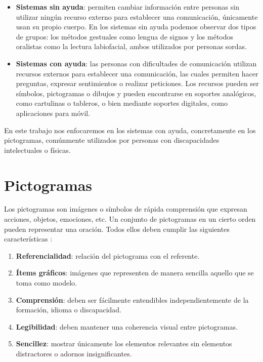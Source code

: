 \begin{itemize}
	\item \textbf{Sistemas sin ayuda}: permiten cambiar información entre personas sin utilizar ningún recurso externo para establecer una comunicación, únicamente usan su propio cuerpo. En los sistemas sin ayuda podemos observar dos tipos de grupos: los métodos gestuales como lengua de signos y los métodos oralistas como la lectura labiofacial, ambos utilizados por personas sordas.
	
	\item \textbf{Sistemas con ayuda}: las personas con dificultades de comunicación utilizan recursos externos para establecer una comunicación, las cuales permiten hacer preguntas, expresar sentimientos o realizar peticiones. Los recursos pueden ser símbolos, pictogramas o dibujos y pueden encontrarse en soportes analógicos, como cartulinas o tableros, o bien mediante soportes digitales, como aplicaciones para móvil.
\end{itemize}

En este trabajo nos enfocaremos en los sistemas con ayuda, concretamente en los pictogramas, comúnmente utilizados por personas con discapacidades intelectuales o físicas.


\section{Pictogramas}
\label{cap3:sec:pictogramas}
Los pictogramas son imágenes o símbolos de rápida comprensión que expresan acciones, objetos, emociones, etc. Un conjunto de pictogramas en un cierto orden pueden representar una oración. Todos ellos deben cumplir las siguientes características \citep{pictoCaract}:
\begin{enumerate}
	\item \textbf{Referencialidad}: relación del pictograma con el referente.
	\item \textbf{Ítems gráficos}: imágenes que representen de manera sencilla aquello que se toma como modelo.
	\item \textbf{Comprensión}: deben ser fácilmente entendibles independientemente de la formación, idioma o discapacidad.
	\item \textbf{Legibilidad}: deben mantener una coherencia visual entre pictogramas.
	\item \textbf{Sencillez}: mostrar únicamente los elementos relevantes sin elementos distractores o adornos insignificantes.
\end{enumerate}


